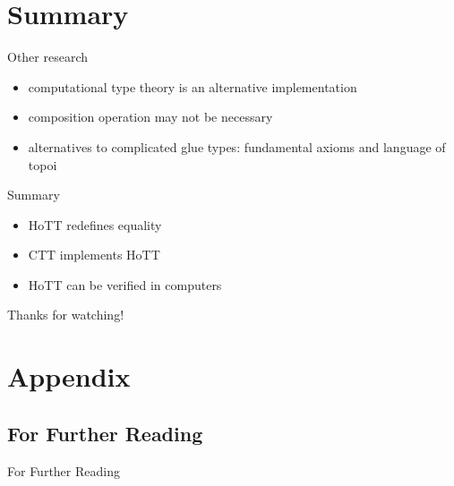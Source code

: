 \documentclass[english]{beamer}
\begin{document}
\section*{Summary}


\begin{frame}{Other research}
    \begin{itemize}
        \item computational type theory is an alternative implementation 
        \item composition operation may not be necessary
        \item alternatives to complicated glue types: fundamental axioms and language of topoi
    \end{itemize}
\end{frame}


\begin{frame}{Summary}

    \begin{itemize}
        \item HoTT redefines equality
        \item CTT implements HoTT
        \item HoTT can be verified in computers 
    \end{itemize}

Thanks for watching!

\end{frame}

\appendix

\section*{Appendix}

\subsection*{For Further Reading}
\begin{frame}[allowframebreaks]{For Further Reading}



\end{frame}
\end{document}
